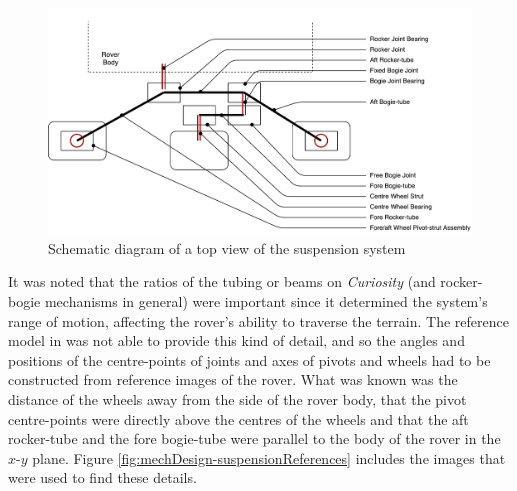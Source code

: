       \begin{figure}[H]
        \centering
        \includegraphics[width=1\linewidth]{figures/mechDesign-suspensionLinkageMap}
        \caption[Schematic diagram of a top view of the suspension system]{Schematic diagram of a top view of the suspension system}
        \label{fig:mechdesign-suspensionLinkageMap}
      \end{figure}
      
      It was noted that the ratios of the tubing or beams on \textit{Curiosity} (and rocker-bogie mechanisms in general) were important since it determined the system's range of motion, affecting the rover's ability to traverse the terrain. The reference model in \cite{nasa3Dprint} was not able to provide this kind of detail, and so the angles and positions of the centre-points of joints and axes of pivots and wheels had to be constructed from reference images of the rover. What was known was the distance of the wheels away from the side of the rover body, that the pivot centre-points were directly above the centres of the wheels and that the aft rocker-tube and the fore bogie-tube were parallel to the body of the rover in the $x$-$y$ plane. Figure \ref{fig:mechDesign-suspensionReferences} includes the images that were used to find these details.
      
